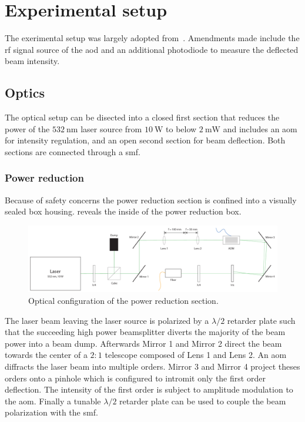 \chapter{Experimental setup}\label{ch:experimental_setup}

The exerimental setup was largely adopted from~\cite{Hertlein2017}. Amendments
made include the \gls{rf} signal source of the \gls{aod} and an additional
photodiode to measure the deflected beam intensity.

\section{Optics}

The optical setup can be disected into a closed first section that reduces
the power of the $\SI{532}{\nano\meter}$ laser source from $\SI{10}{\watt}$
to below $\SI{2}{\milli\watt}$ and includes an \gls{aom} for intensity
regulation, and an open second section for beam deflection.
Both sections are connected through a \gls{smf}.

\subsection{Power reduction}\label{subsec:setup_power_reduction}

Because of safety concerns the power reduction section is confined into a
visually sealed box housing.  reveals the
inside of the power reduction box.
\begin{figure}[htb]
  \centering
  \includegraphics[width=\textwidth]{../figure/setup/power-reduction.pdf}
  \caption{Optical configuration of the power reduction section.
  }\label{fig:setup_power_reduction}
\end{figure}
The laser beam leaving the laser source is polarized by a $\lambda/2$ retarder
plate such that the succeeding high power beamsplitter diverts the majority
of the beam power into a beam dump. Afterwards Mirror 1 and Mirror 2 direct
the beam towards the center of a $2:1$ telescope composed of Lens 1 and
Lens 2. An \gls{aom} diffracts the laser beam into multiple orders. Mirror 3
and Mirror 4 project theses orders onto a pinhole which is configured to
intromit only the first order deflection. The intensity of the first order is
subject to amplitude modulation to the \gls{aom}. Finally a tunable
$\lambda/2$ retarder plate can be used to couple the beam polarization with
the \gls{smf}.

